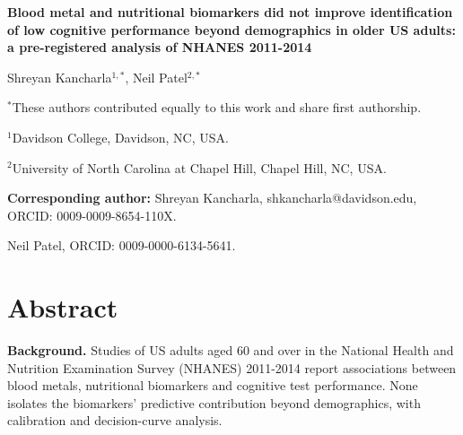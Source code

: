 \documentclass[12pt]{article}
\title{}
\date{}
\begin{document}
\linenumbers

\begin{singlespace}
\begin{center}
{\Large\bfseries Blood metal and nutritional biomarkers did not improve identification of low cognitive performance beyond demographics in older US adults: a pre-registered analysis of NHANES 2011-2014\par}
\end{center}

\bigskip

\begin{center}
Shreyan Kancharla$^{1,\ast}$, Neil Patel$^{2,\ast}$
\end{center}

\medskip

\noindent $^{\ast}$These authors contributed equally to this work and share first authorship.

\medskip

\noindent $^{1}$Davidson College, Davidson, NC, USA.

\noindent $^{2}$University of North Carolina at Chapel Hill, Chapel Hill, NC, USA.

\medskip

\noindent \textbf{Corresponding author:} Shreyan Kancharla, shkancharla@davidson.edu, ORCID: 0009-0009-8654-110X.

\noindent Neil Patel, ORCID: 0009-0000-6134-5641.

\end{singlespace}

\clearpage

\doublespacing
\section*{Abstract}

\textbf{Background.} Studies of US adults aged 60 and over in the National Health and Nutrition Examination Survey (NHANES) 2011-2014 report associations between blood metals, nutritional biomarkers and cognitive test performance. None isolates the biomarkers' predictive contribution beyond demographics, with calibration and decision-curve analysis.
\end{document}
